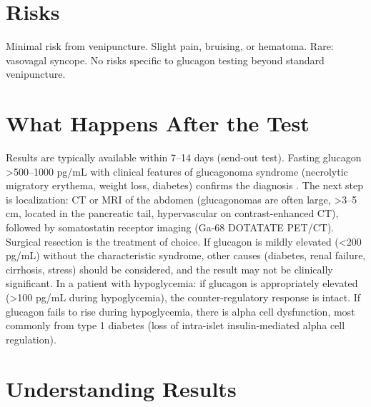 \section*{Risks}
Minimal risk from venipuncture. Slight pain, bruising, or hematoma. Rare: vasovagal syncope. No risks specific to glucagon testing beyond standard venipuncture.

\section*{What Happens After the Test}
Results are typically available within 7--14 days (send-out test). Fasting glucagon >500--1000 pg/mL with clinical features of glucagonoma syndrome (necrolytic migratory erythema, weight loss, diabetes) confirms the diagnosis \cite{eldor2011glucagonoma}. The next step is localization: CT or MRI of the abdomen (glucagonomas are often large, >3--5 cm, located in the pancreatic tail, hypervascular on contrast-enhanced CT), followed by somatostatin receptor imaging (Ga-68 DOTATATE PET/CT). Surgical resection is the treatment of choice. If glucagon is mildly elevated (<200 pg/mL) without the characteristic syndrome, other causes (diabetes, renal failure, cirrhosis, stress) should be considered, and the result may not be clinically significant. In a patient with hypoglycemia: if glucagon is appropriately elevated (>100 pg/mL during hypoglycemia), the counter-regulatory response is intact. If glucagon fails to rise during hypoglycemia, there is alpha cell dysfunction, most commonly from type 1 diabetes (loss of intra-islet insulin-mediated alpha cell regulation).

\section*{Understanding Results}


